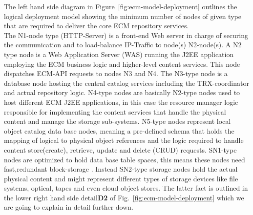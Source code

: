 \documentclass[EPiC]{easychair} %
\begin{document}
    The left hand side diagram in Figure~\ref{fig:ecm-model-deployment} outlines the logical deployment model showing the minimum number of nodes of given type that are required to deliver the core ECM repository services. \\ The N1-node type (HTTP-Server) is a front-end Web server in charge of securing the communication and to load-balance IP-Traffic to node(s) N2-node(s). A N2 type node is a Web Application Server (WAS) running the J2EE application employing the ECM business logic and higher-level content services. This node dispatches ECM-API requests to nodes N3 and N4. The N3-type node is a database node hosting the central catalog services including the TRX-coordinator and actual repository logic. N4-type nodes are basically N2-type nodes used to host different ECM J2EE applications, in this case the resource manager logic responsible for implementing the content services that handle the physical content and manage the storage sub-systems. N5-type nodes represent local object catalog data base nodes, meaning a pre-defined schema that holds the mapping of logical to physical object references and the logic required to handle content store(create), retrieve, update and delete (CRUD) requests. SN1-type nodes are optimized to hold data base table spaces, this means these nodes need fast,redundant block-storage . Instead SN2-type storage nodes hold the actual physical content and might represent different types of storage devices like file systems, optical, tapes and even cloud object stores. The latter fact is outlined in the lower right hand side detail\textbf{D2} of Fig.~\ref{fig:ecm-model-deployment} 
    which we are going to explain  in detail further down.   
\end{document}
